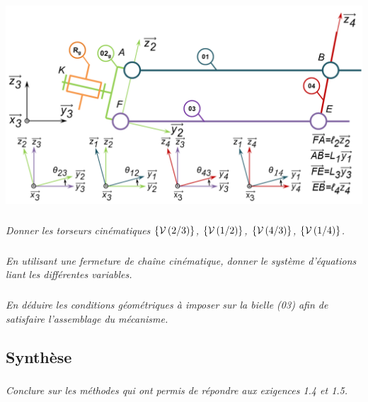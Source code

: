 \documentclass[10pt,fleqn]{article} %
\begin{document}
\begin{multicols}{2}
\begin{center}
\includegraphics[width=\linewidth]{images/add_01.png}
\end{center}


\subparagraph{}
\textit{Donner les torseurs cinématiques $\left\{\mathcal{V} \left(2/3 \right) \right\}$, $\left\{\mathcal{V} \left(1/2 \right) \right\}$, $\left\{\mathcal{V} \left(4/3 \right) \right\}$, $\left\{\mathcal{V} \left(1/4 \right) \right\}$.}
\ifprof
\begin{corrige}
\end{corrige}\else\fi


\subparagraph{}
\textit{En utilisant une fermeture de chaîne cinématique, donner le système d’équations liant les différentes variables.}
\ifprof
\begin{corrige}
\end{corrige}\else\fi



\subparagraph{}
\textit{En déduire les conditions géométriques à imposer sur la bielle (03) afin de satisfaire l’assemblage du mécanisme. }
\ifprof
\begin{corrige}
\end{corrige}\else\fi



\subsection*{Synthèse}
\subparagraph{}
\textit{Conclure sur les méthodes qui ont permis de répondre aux exigences 1.4 et 1.5.}
\ifprof
\begin{corrige}
\end{corrige}\else\fi
\end{multicols}
\end{document}

